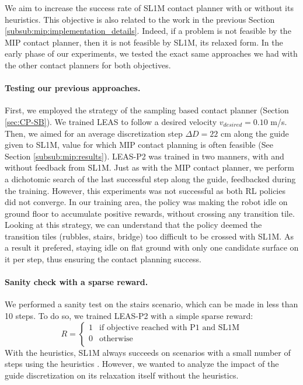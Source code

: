 We aim to increase the success rate of SL1M contact planner with or without its heuristics.
This objective is also related to the work in the previous Section \ref{subsub:mip:implementation_details}. 
Indeed, if a problem is not feasible by the MIP contact planner, then it is not feasible by SL1M, its relaxed form.
In the early phase of our experiments, we tested the exact same approaches we had with the other contact planners for both objectives.

\paragraph{Testing our previous approaches.}
First, we employed the strategy of the sampling based contact planner (Section \ref{sec:CP-SB}). 
We trained LEAS to follow a desired velocity $v_{desired}=0.10$ m/s. 
Then, we aimed for an average discretization step $\Delta D=22$ cm along the guide given to SL1M, value for which MIP contact planning is often feasible (See Section \ref{subsub:mip:results}).
LEAS-P2 was trained in two manners, with and without feedback from SL1M. Just as with the MIP contact planner, we perform a dichotomic search of the last successful step along the guide, feedbacked during the training.
However, this experiments was not successful as both RL policies did not converge.
In our training area, the policy was making the robot idle on ground floor to accumulate positive rewards, without crossing any transition tile. Looking at this strategy, we can understand that the policy deemed the transition tiles (rubbles, stairs, bridge) too difficult to be crossed with SL1M. As a result it prefered, staying idle on flat ground with only one candidate surface on it per step, thus ensuring the contact planning success.

\paragraph{Sanity check with a sparse reward.}
We performed a sanity test on the stairs scenario, which can be made in less than 10 steps.
To do so, we trained LEAS-P2 with a simple sparse reward:
\begin{equation}
    R = \left\{
    \begin{array}{ll}
        1 & \mbox{if objective reached with P1 and SL1M}\\
        0 & \mbox{otherwise}\\
    \end{array}
\right.
\end{equation}
With the heuristics, SL1M always succeeds on scenarios with a small number of steps using the heuristics \cite{sl1m_v1}.
However, we wanted to analyze the impact of the guide discretization on its relaxation itself without the heuristics.


